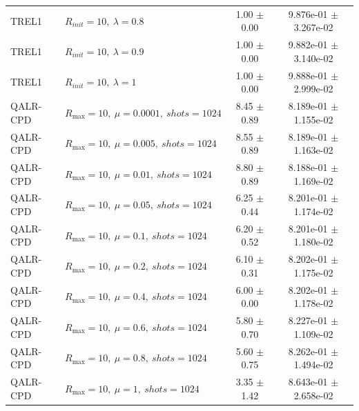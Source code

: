 \begin{table}[t]
\begin{tabular}{@{}llcc@{}}
TREL1 & \(R_{init}=10,\ \lambda=0.8\) & 1.00 $\pm$ 0.00 & 9.876e-01 $\pm$ 3.267e-02 \\
TREL1 & \(R_{init}=10,\ \lambda=0.9\) & 1.00 $\pm$ 0.00 & 9.882e-01 $\pm$ 3.140e-02 \\
TREL1 & \(R_{init}=10,\ \lambda=1\) & 1.00 $\pm$ 0.00 & 9.888e-01 $\pm$ 2.999e-02 \\
QALR-CPD & \(R_{\max}=10,\ \mu=0.0001,\ shots=1024\) & 8.45 $\pm$ 0.89 & 8.189e-01 $\pm$ 1.155e-02 \\
QALR-CPD & \(R_{\max}=10,\ \mu=0.005,\ shots=1024\) & 8.55 $\pm$ 0.89 & 8.189e-01 $\pm$ 1.163e-02 \\
QALR-CPD & \(R_{\max}=10,\ \mu=0.01,\ shots=1024\) & 8.80 $\pm$ 0.89 & 8.188e-01 $\pm$ 1.169e-02 \\
QALR-CPD & \(R_{\max}=10,\ \mu=0.05,\ shots=1024\) & 6.25 $\pm$ 0.44 & 8.201e-01 $\pm$ 1.174e-02 \\
QALR-CPD & \(R_{\max}=10,\ \mu=0.1,\ shots=1024\) & 6.20 $\pm$ 0.52 & 8.201e-01 $\pm$ 1.180e-02 \\
QALR-CPD & \(R_{\max}=10,\ \mu=0.2,\ shots=1024\) & 6.10 $\pm$ 0.31 & 8.202e-01 $\pm$ 1.175e-02 \\
QALR-CPD & \(R_{\max}=10,\ \mu=0.4,\ shots=1024\) & 6.00 $\pm$ 0.00 & 8.202e-01 $\pm$ 1.178e-02 \\
QALR-CPD & \(R_{\max}=10,\ \mu=0.6,\ shots=1024\) & 5.80 $\pm$ 0.70 & 8.227e-01 $\pm$ 1.109e-02 \\
QALR-CPD & \(R_{\max}=10,\ \mu=0.8,\ shots=1024\) & 5.60 $\pm$ 0.75 & 8.262e-01 $\pm$ 1.494e-02 \\
QALR-CPD & \(R_{\max}=10,\ \mu=1,\ shots=1024\) & 3.35 $\pm$ 1.42 & 8.643e-01 $\pm$ 2.658e-02 \\
\bottomrule
\end{tabular}
\end{table}